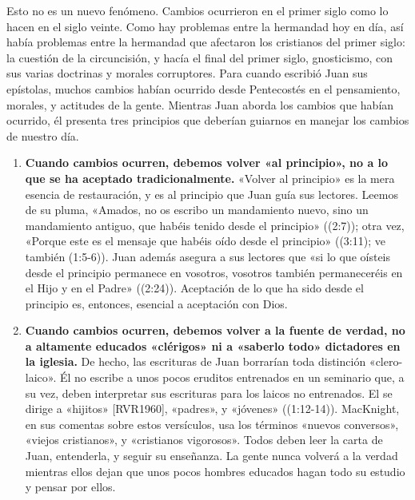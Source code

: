 \documentclass[12pt, twoside, openright]{book}
\begin{document}
Esto no es un nuevo fenómeno. Cambios ocurrieron en el primer siglo como lo hacen en el siglo veinte. Como hay problemas entre la hermandad hoy en día, así había problemas entre la hermandad que afectaron los cristianos del primer siglo: la cuestión de la circuncisión, y hacía el final del primer siglo, gnosticismo, con sus varias doctrinas y morales corruptores. Para cuando escribió Juan sus epístolas, muchos cambios habían ocurrido desde Pentecostés en el pensamiento, morales, y actitudes de la gente. Mientras Juan aborda los cambios que habían ocurrido, él presenta tres principios que deberían guiarnos en manejar los cambios de nuestro día.
\begin{enumerate}
\item \textbf{Cuando cambios ocurren, debemos volver «al principio», no a lo que se ha aceptado tradicionalmente.} «Volver al principio» es la mera esencia de restauración, y es al principio que Juan guía sus lectores. Leemos de su pluma, «Amados, no os escribo un mandamiento nuevo, sino un mandamiento antiguo, que habéis tenido desde el principio» ((2:7)); otra vez, «Porque este es el mensaje que habéis oído desde el principio» ((3:11); ve también (1:5-6)). Juan además asegura a sus lectores que «si lo que oísteis desde el principio permanece en vosotros, vosotros también permaneceréis en el Hijo y en el Padre» ((2:24)). Aceptación de lo que ha sido desde el principio es, entonces, esencial a aceptación con Dios.
\item \textbf{Cuando cambios ocurren, debemos volver a la fuente de verdad, no a altamente educados «clérigos» ni a «saberlo todo» dictadores en la iglesia.} De hecho, las escrituras de Juan borrarían toda distinción «clero-laico». Él no escribe a unos pocos eruditos entrenados en un seminario que, a su vez, deben interpretar sus escrituras para los laicos no entrenados. El se dirige a «hijitos» [RVR1960], «padres», y «jóvenes» ((1:12-14)). MacKnight, en sus comentas sobre estos versículos, usa los términos «nuevos conversos», «viejos cristianos», y «cristianos vigorosos». Todos deben leer la carta de Juan, entenderla, y seguir su enseñanza. La gente nunca volverá a la verdad mientras ellos dejan que unos pocos hombres educados hagan todo su estudio y pensar por ellos. 


\end{enumerate}
\end{document}
